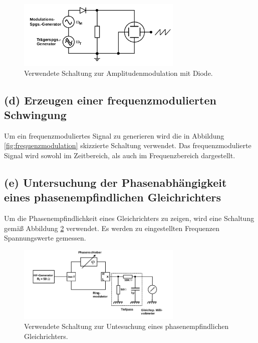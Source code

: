 \begin{figure}
  \centering
  \includegraphics[width=0.7\textwidth]{figures/c_d.png}
  \caption{Verwendete Schaltung zur Amplitudenmodulation mit Diode.\cite{sample}}
  \label{fig:schaltung_c}
\end{figure}


\FloatBarrier
\subsection{(d) Erzeugen einer frequenzmodulierten Schwingung}
\label{subsec:durchfuehrung_d}
Um ein frequenzmoduliertes Signal zu generieren wird die in Abbildung
\ref{fig:frequenzmodulation} skizzierte Schaltung verwendet.
Das frequenzmodulierte Signal wird sowohl im Zeitbereich, als auch
im Frequenzbereich dargestellt.


\FloatBarrier
\subsection{(e) Untersuchung der Phasenabhängigkeit eines
phasenempfindlichen Gleichrichters}
\label{subsec:durchfuehrung_e}
Um die Phasenempfindlichkeit eines Gleichrichters zu zeigen,
wird eine Schaltung gemäß Abbildung \ref{fig:schaltung_e} verwendet.
Es werden zu eingestellten Frequenzen Spannungswerte gemessen.

\begin{figure}
  \centering
  \includegraphics[width=0.7\textwidth]{figures/e_d.png}
  \caption{Verwendete Schaltung zur Untesuchung eines phasenempfindlichen Gleichrichters.\cite{sample}}
  \label{fig:schaltung_e}
\end{figure}


